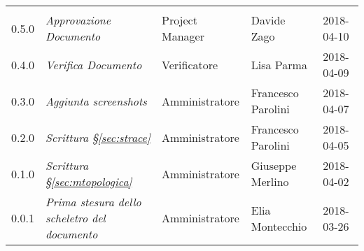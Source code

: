 \newpage 
\section*{}
\begin{table}[H]
	\centering
	\begin{tabular}{C{2cm}|C{4cm}|C{3cm}|C{3cm}|R{2cm}}
		
		 & & & & \\
		
		
		0.5.0  & \emph{Approvazione Documento} & Project Manager & Davide Zago &  2018-04-10 \\
		\hline
		
		0.4.0  & \emph{Verifica Documento} & Verificatore & Lisa Parma &  2018-04-09 \\
		\hline
		
		0.3.0 & \emph{Aggiunta screenshots} & Amministratore & Francesco Parolini &  2018-04-07 \\
		\hline
		
		0.2.0 & \emph{Scrittura §\ref{sec:strace}} & Amministratore & Francesco Parolini &  2018-04-05 \\
		\hline
		
		0.1.0 & \emph{Scrittura §\ref{sec:mtopologica}} & Amministratore & Giuseppe Merlino &  2018-04-02 \\
		\hline
		
		
		0.0.1 & \emph{Prima stesura dello scheletro del documento} & Amministratore & Elia Montecchio &  2018-03-26 \\
		
		
	\end{tabular}
	
\end{table}


\clearpage